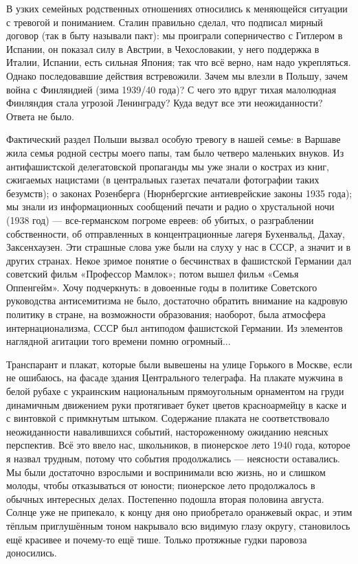 \label{22-2}
В узких семейных родственных отношениях относились к меняющейся ситуации с тревогой и пониманием. %
Сталин правильно сделал, что подписал мирный договор (так в быту называли пакт): мы проиграли соперничество с Гитлером в Испании, он показал силу в Австрии, в Чехословакии, у него поддержка в Италии, Испании, есть сильная Япония; так что всё верно, нам надо укрепляться. Однако последовавшие действия встревожили. Зачем мы влезли в Польшу, зачем война с Финляндией (зима 1939/40 года)? %
С чего это вдруг тихая малолюдная Финляндия стала угрозой Ленинграду? Куда ведут все эти неожиданности? Ответа не было.

\label{23-1}
Фактический раздел Польши вызвал особую тревогу в нашей семье: в Варшаве жила семья родной сестры моего папы, там было четверо маленьких внуков. Из антифашистской делегатовской пропаганды мы уже знали о кострах из книг, сжигаемых нацистами (в центральных газетах печатали фотографии таких безумств); о законах Розенберга (Нюрнбергские антиеврейские законы 1935 года); мы знали из информационных сообщений печати и радио о хрустальной ночи (1938 год) — все-германском погроме евреев: об убитых, о разграблении собственности, об отправленных в концентрационные лагеря Бухенвальд, Дахау, Заксенхаузен. Эти страшные слова уже были на слуху у нас в СССР, а значит и в других странах. Некое зримое понятие о бесчинствах в фашистской Германии дал советский фильм «Профессор Мамлок»; потом вышел фильм «Семья Оппенгейм». Хочу подчеркнуть: в довоенные годы в политике Советского руководства антисемитизма не было, достаточно обратить внимание на кадровую политику в стране, на возможности образования; наоборот, была атмосфера интернационализма, СССР был антиподом фашистской Германии. Из элементов наглядной агитации того времени помню огромный...

\label{24-1}
Транспарант и плакат, которые были вывешены на улице Горького в Москве, если не ошибаюсь, на фасаде здания Центрального телеграфа. На плакате мужчина в белой рубахе с украинским национальным прямоугольным орнаментом на груди динамичным движением руки протягивает букет цветов красноармейцу в каске и с винтовкой с примкнутым штыком. Содержание плаката не соответствовало неожиданности навалившихся событий, настороженному ожиданию неясных перспектив. Всё это ввело нас, школьников, в пионерское лето 1940 года, которое я назвал трудным, потому что события продолжались — неясности оставались. Мы были достаточно взрослыми и воспринимали всю жизнь, но и слишком молоды, чтобы отказываться от юности; пионерское лето продолжалось в обычных интересных делах. Постепенно подошла вторая половина августа. Солнце уже не припекало, к концу дня оно приобретало оранжевый окрас, и этим тёплым приглушённым тоном накрывало всю видимую глазу округу, становилось ещё красивее и почему-то ещё тише. Только протяжные гудки паровоза доносились.

